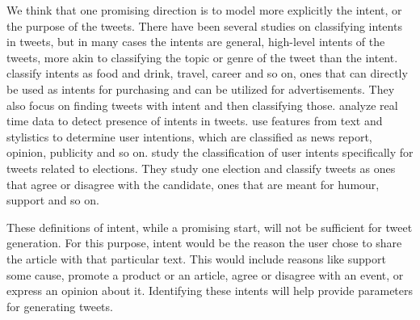 We think that one promising direction is to model more explicitly the intent, or the purpose of the tweets. There have been several studies on classifying intents in tweets, but in many cases the intents are general, high-level intents of the tweets, more akin to classifying the topic or genre of the tweet than the intent.  classify intents as food and drink, travel, career and so on, ones that can directly be used as intents for purchasing and can be utilized for advertisements. They also focus on finding tweets with intent and then classifying those.  analyze real time data to detect presence of intents in tweets.  use features from text and stylistics to determine user intentions, which are classified as news report, opinion, publicity and so on.  study the classification of user intents specifically for tweets related to elections. They study one election and classify tweets as ones that agree or disagree with the candidate, ones that are meant for humour, support and so on. 

These definitions of intent, while a promising start, will not be sufficient for tweet generation. For this purpose, intent would be the reason the user chose to share the article with that particular text. This would include reasons like support some cause, promote a product or an article, agree or disagree with an event, or express an opinion about it. Identifying these intents will help provide parameters for generating tweets. 